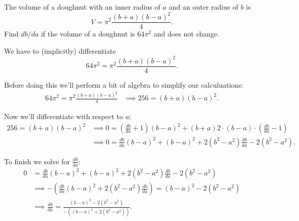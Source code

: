 \documentclass[nooutcomes,handout]{ximera}
\begin{document}
\begin{problem}
  The volume of a doughnut with an inner radius of $a$ and an outer radius of $b$ is 
  \[
    V = \pi^2 \frac{(b+a)(b-a)^2}{4}.
  \]
  Find $db/da$ if the volume of a doughnut is $64\pi^2$ and does not change.
\begin{freeResponse}
  We have to (implicitly) differentiate
  \[
    64\pi^2 = \pi^2 \frac{(b+a)(b-a)^2}{4}.
  \]
  
  Before doing this we'll perform a bit of algebra to simplify our calculuations:
  \begin{align*}
    64\pi^2 = \pi^2 \frac{(b+a)(b-a)^2}{4} &\implies 256 =  (b+a)(b-a)^2.
  \end{align*}

  Now we'll differentiate with respect to $a$:
  \begin{align*}
    256 = (b+a)(b-a)^2 &\implies 0 = \left(\frac{db}{da} + 1\right)(b - a)^2 + (b + a) 2 \cdot (b - a) \cdot \left(\frac{db}{da} - 1\right) \\
    &\implies 0 = \frac{db}{da}(b-a)^2 + (b-a)^2 + 2(b^2-a^2) \frac{db}{da} - 2(b^2 - a^2).
  \end{align*}

  To finish we solve for $\frac{db}{da}$:
  \begin{align*}
    0 &= \frac{db}{da}(b-a)^2 + (b-a)^2 + 2(b^2-a^2) \frac{db}{da} - 2(b^2 - a^2) \\
      &\implies
        - \left(\frac{db}{da}(b-a)^2 + 2(b^2-a^2) \frac{db}{da}\right) = (b-a)^2 - 2(b^2 - a^2)\\
    &\implies
      \frac{db}{da} = \frac{(b-a)^2 - 2(b^2 - a^2)}{-((b-a)^2 + 2(b^2-a^2))}.
  \end{align*}
\end{freeResponse}	
\end{problem}

\end{document}
